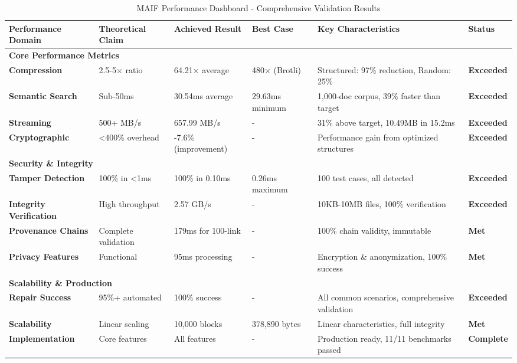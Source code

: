 \documentclass[conference]{IEEEtran}
\begin{document}
\begin{table*}[!t]
\renewcommand{\arraystretch}{1.3}
\caption{MAIF Performance Dashboard - Comprehensive Validation Results}
\label{tab:performance-dashboard}
\centering
\footnotesize
\begin{tabular}{p{3cm}p{2.5cm}p{2.5cm}p{2.5cm}p{2.5cm}p{2cm}}
\toprule
\textbf{Performance Domain} & \textbf{Theoretical Claim} & \textbf{Achieved Result} & \textbf{Best Case} & \textbf{Key Characteristics} & \textbf{Status} \\
\midrule
\multicolumn{6}{l}{\textbf{Core Performance Metrics}} \\
\midrule
\textbf{Compression} & 2.5-5× ratio & 64.21× average & 480× (Brotli) & Structured: 97\% reduction, Random: 25\% & \textbf{Exceeded} \\
\textbf{Semantic Search} & Sub-50ms & 30.54ms average & 29.63ms minimum & 1,000-doc corpus, 39\% faster than target & \textbf{Exceeded} \\
\textbf{Streaming} & 500+ MB/s & 657.99 MB/s & - & 31\% above target, 10.49MB in 15.2ms & \textbf{Exceeded} \\
\textbf{Cryptographic} & <400\% overhead & -7.6\% (improvement) & - & Performance gain from optimized structures & \textbf{Exceeded} \\
\midrule
\multicolumn{6}{l}{\textbf{Security \& Integrity}} \\
\midrule
\textbf{Tamper Detection} & 100\% in <1ms & 100\% in 0.10ms & 0.26ms maximum & 100 test cases, all detected & \textbf{Exceeded} \\
\textbf{Integrity Verification} & High throughput & 2.57 GB/s & - & 10KB-10MB files, 100\% verification & \textbf{Exceeded} \\
\textbf{Provenance Chains} & Complete validation & 179ms for 100-link & - & 100\% chain validity, immutable & \textbf{Met} \\
\textbf{Privacy Features} & Functional & 95ms processing & - & Encryption \& anonymization, 100\% success & \textbf{Met} \\
\midrule
\multicolumn{6}{l}{\textbf{Scalability \& Production}} \\
\midrule
\textbf{Repair Success} & 95\%+ automated & 100\% success & - & All common scenarios, comprehensive validation & \textbf{Exceeded} \\
\textbf{Scalability} & Linear scaling & 10,000 blocks & 378,890 bytes & Linear characteristics, full integrity & \textbf{Met} \\
\textbf{Implementation} & Core features & All features & - & Production ready, 11/11 benchmarks passed & \textbf{Complete} \\
\bottomrule
\end{tabular}
\end{table*}
\end{document}
